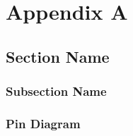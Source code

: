 \chapter{Appendix A}
\section{Section Name}
\subsection{Subsection Name}

\subsection{Pin Diagram}




